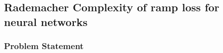 \newpage
\subsection{Rademacher Complexity of ramp loss for neural networks}
\subsubsection{Problem Statement}

